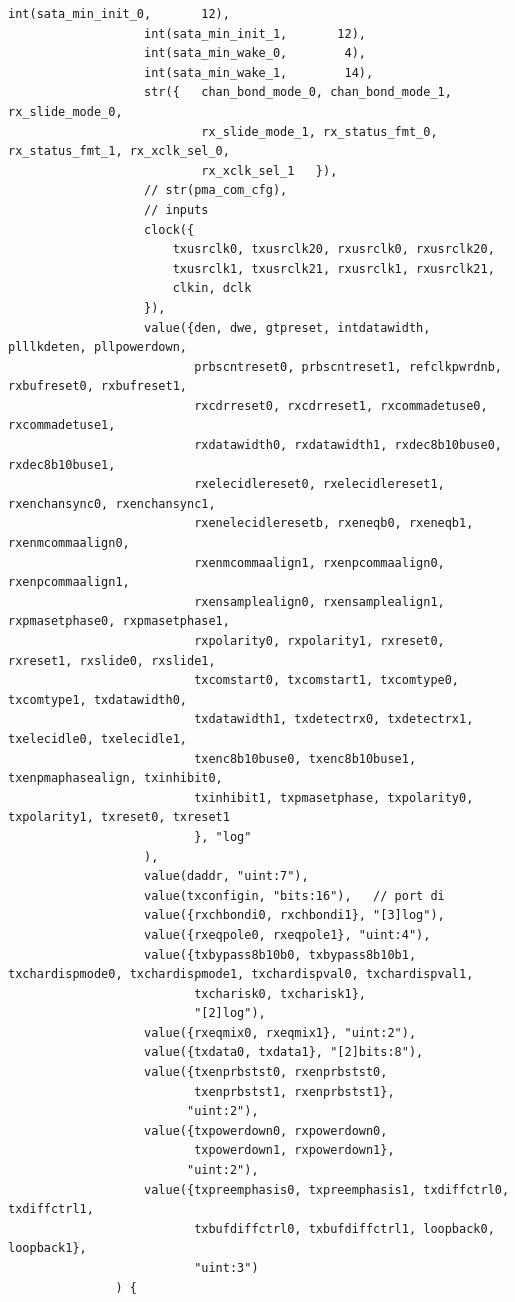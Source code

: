 \begin{lstlisting}[gobble=12, language=threepl]
                   int(sata_min_init_0,       12),
                   int(sata_min_init_1,       12),
                   int(sata_min_wake_0,        4),
                   int(sata_min_wake_1,        14),
                   str({   chan_bond_mode_0, chan_bond_mode_1, rx_slide_mode_0,
                           rx_slide_mode_1, rx_status_fmt_0, rx_status_fmt_1, rx_xclk_sel_0,
                           rx_xclk_sel_1   }),
                   // str(pma_com_cfg),
                   // inputs
                   clock({
                       txusrclk0, txusrclk20, rxusrclk0, rxusrclk20,
                       txusrclk1, txusrclk21, rxusrclk1, rxusrclk21,
                       clkin, dclk
                   }),
                   value({den, dwe, gtpreset, intdatawidth, plllkdeten, pllpowerdown,
                          prbscntreset0, prbscntreset1, refclkpwrdnb, rxbufreset0, rxbufreset1,
                          rxcdrreset0, rxcdrreset1, rxcommadetuse0, rxcommadetuse1,
                          rxdatawidth0, rxdatawidth1, rxdec8b10buse0, rxdec8b10buse1,
                          rxelecidlereset0, rxelecidlereset1, rxenchansync0, rxenchansync1,
                          rxenelecidleresetb, rxeneqb0, rxeneqb1, rxenmcommaalign0,
                          rxenmcommaalign1, rxenpcommaalign0, rxenpcommaalign1,
                          rxensamplealign0, rxensamplealign1, rxpmasetphase0, rxpmasetphase1,
                          rxpolarity0, rxpolarity1, rxreset0, rxreset1, rxslide0, rxslide1,
                          txcomstart0, txcomstart1, txcomtype0, txcomtype1, txdatawidth0,
                          txdatawidth1, txdetectrx0, txdetectrx1, txelecidle0, txelecidle1,
                          txenc8b10buse0, txenc8b10buse1, txenpmaphasealign, txinhibit0,
                          txinhibit1, txpmasetphase, txpolarity0, txpolarity1, txreset0, txreset1
                          }, "log"
                   ),
                   value(daddr, "uint:7"),
                   value(txconfigin, "bits:16"),   // port di
                   value({rxchbondi0, rxchbondi1}, "[3]log"),
                   value({rxeqpole0, rxeqpole1}, "uint:4"),
                   value({txbypass8b10b0, txbypass8b10b1, txchardispmode0, txchardispmode1, txchardispval0, txchardispval1,
                          txcharisk0, txcharisk1},
                          "[2]log"),
                   value({rxeqmix0, rxeqmix1}, "uint:2"),
                   value({txdata0, txdata1}, "[2]bits:8"),
                   value({txenprbstst0, rxenprbstst0,
                          txenprbstst1, rxenprbstst1},
                         "uint:2"),  
                   value({txpowerdown0, rxpowerdown0,
                          txpowerdown1, rxpowerdown1},
                         "uint:2"),
                   value({txpreemphasis0, txpreemphasis1, txdiffctrl0, txdiffctrl1,
                          txbufdiffctrl0, txbufdiffctrl1, loopback0, loopback1},
                          "uint:3")
               ) {
            \end{lstlisting}

